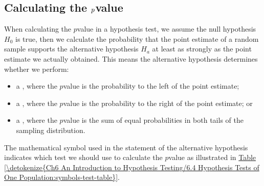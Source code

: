 \documentclass[letterpaper,10pt,english]{jupyterBook}
\begin{document}
\subsection{Calculating the \protect\(p\protect\)\sphinxhyphen{}value}
\label{\detokenize{Ch6 An Introduction to Hypothesis Testing/6.4 Hypothesis Tests of One Population:calculating-the-p-value}}
\sphinxAtStartPar
When calculating the \(p\)\sphinxhyphen{}value in a hypothesis test, we assume the null hypothesis \(H_0\) is true, then we calculate the probability that the point estimate of a random sample supports the alternative hypothesis \(H_a\) at least as strongly as the point estimate we actually obtained. This means the alternative hypothesis determines whether we perform:
\begin{itemize}
\item {} 
\sphinxAtStartPar
a , where the \(p\)\sphinxhyphen{}value is the probability to the left of the point estimate;

\item {} 
\sphinxAtStartPar
a , where the \(p\)\sphinxhyphen{}value is the probability to the right of the point estimate; or

\item {} 
\sphinxAtStartPar
a , where the \(p\)\sphinxhyphen{}value is the sum of equal probabilities in both tails of the sampling distribution.

\end{itemize}

\sphinxAtStartPar
The mathematical symbol used in the statement of the alternative hypothesis indicates which test we should use to calculate the \(p\)\sphinxhyphen{}value as illustrated in \hyperref[\detokenize{Ch6 An Introduction to Hypothesis Testing/6.4 Hypothesis Tests of One Population:symbols-test-table}]{Table \ref{\detokenize{Ch6 An Introduction to Hypothesis Testing/6.4 Hypothesis Tests of One Population:symbols-test-table}}}.
\end{document}
